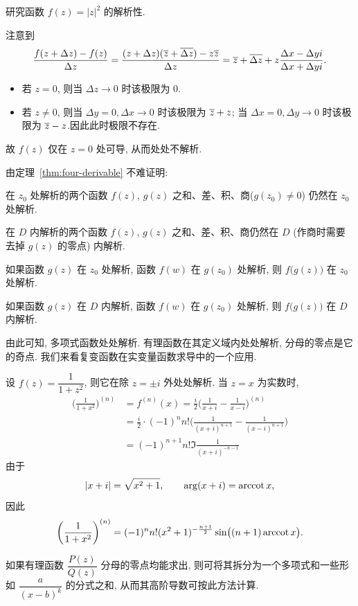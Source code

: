 \begin{example}
  研究函数 $f(z)=|z|^2$ 的解析性.
\end{example}
\begin{solution}
  注意到
  \[
    \frac{f(z+\Delta z)-f(z)}{\Delta z}
    =\frac{(z+\Delta z)(\overline z+\overline{\Delta z})-z\overline z}{\Delta z}
    =\overline z+\overline{\Delta z}+z\frac{\Delta x-\Delta yi}{\Delta x+\Delta yi}.
  \]
  \begin{itemize}
    \item 若 $z=0$, 则当 $\Delta z\to 0$ 时该极限为 $0$.
    \item 若 $z\neq0$, 则当 $\Delta y=0,\Delta x\to 0$ 时该极限为 $\overline z+z$; 当 $\Delta x=0,\Delta y\to 0$ 时该极限为 $\overline z-z$.因此此时极限不存在.
  \end{itemize}
  故 $f(z)$ 仅在 $z=0$ 处可导, 从而处处不解析.
\end{solution}

由定理~\ref{thm:four-derivable} 不难证明:
\begin{theorem}
  \begin{enumpar}
    \item 在 $z_0$ 处解析的两个函数 $f(z)$, $g(z)$ 之和、差、积、商($g(z_0)\neq 0$) 仍然在 $z_0$ 处解析.
    \item 在 $D$ 内解析的两个函数 $f(z)$, $g(z)$ 之和、差、积、商仍然在 $D$ (作商时需要去掉 $g(z)$ 的零点) 内解析.
    \item 如果函数 $g(z)$ 在 $z_0$ 处解析, 函数 $f(w)$ 在 $g(z_0)$ 处解析, 则 $f\bigl(g(z)\bigr)$ 在 $z_0$ 处解析.
    \item 如果函数 $g(z)$ 在 $D$ 内解析, 函数 $f(w)$ 在 $g(z_0)$ 处解析, 则 $f\bigl(g(z)\bigr)$ 在 $D$ 内解析.
  \end{enumpar}
\end{theorem}

由此可知, 多项式函数处处解析. 有理函数在其定义域内处处解析, 分母的零点是它的奇点.
我们来看复变函数在实变量函数求导中的一个应用.
\begin{example}
  设 $f(z)=\dfrac1{1+z^2}$, 则它在除 $z=\pm i$ 外处处解析.
  当 $z=x$ 为实数时,
  \begin{align*}
    \biggl(\frac1{1+x^2}\biggr)^{(n)}&
      =f^{(n)}(x)=\frac i2\biggl(\frac1{x+i}-\frac1{x-i}\biggr)^{(n)}\\
    &=\frac i2\cdot(-1)^n n!\biggl(\frac1{(x+i)^{n+1}}-\frac1{(x-i)^{n+1}}\biggr)\\
    &=(-1)^{n+1}n!\Im\frac1{(x+i)^{-n-1}}
  \end{align*}
  由于
  \[
    |x+i|=\sqrt{x^2+1},\qquad
    \arg(x+i)=\operatorname{arccot} x,
  \]
  因此
  \[
    \biggl(\frac1{1+x^2}\biggr)^{(n)}
    =(-1)^nn!(x^2+1)^{-\frac{n+1}2}\sin\bigl((n+1)\operatorname{arccot} x\bigr).
  \]
\end{example}
如果有理函数 $\dfrac{P(z)}{Q(z)}$ 分母的零点均能求出, 则可将其拆分为一个多项式和一些形如 $\dfrac{a}{(x-b)^k}$ 的分式之和, 从而其高阶导数可按此方法计算.

